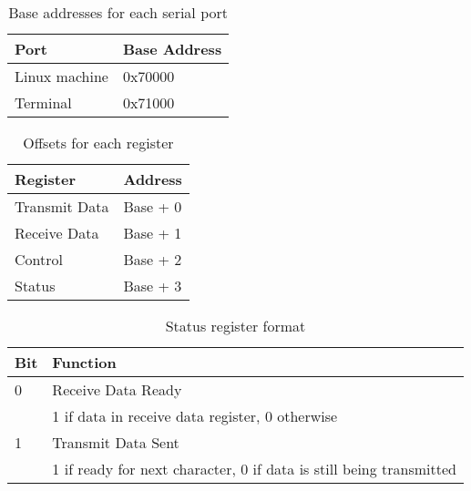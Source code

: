 \documentclass[a4paper,10pt]{article}
\begin{document}
\begin{table}[h]
\begin{center}
\begin{tabular}{|l|l|}
\hline
\textbf{Port} & \textbf{Base Address} \\
\hline
Linux machine & 0x70000 \\ 
\hline
Terminal & 0x71000 \\
\hline
\end{tabular}
\end{center}
\caption{Base addresses for each serial port}
\label{table:serialbase}
\end{table}

\begin{table}[h]
\begin{center}
\begin{tabular}{|l|l|}
\hline
\textbf{Register} & \textbf{Address} \\
\hline
Transmit Data & Base + 0 \\ 
\hline
Receive Data & Base + 1 \\
\hline
Control & Base + 2 \\
\hline
Status & Base + 3 \\
\hline
\end{tabular}
\end{center}
\caption{Offsets for each register}
\label{table:serialoffset}
\end{table}

\begin{table}[h]
\begin{center}
\begin{tabular}{|l|l|}
\hline
\textbf{Bit} & \textbf{Function} \\
\hline
0 & Receive Data Ready \\
 & 1 if data in receive data register, 0 otherwise \\
\hline
1 & Transmit Data Sent \\
 & 1 if ready for next character, 0 if data is still being transmitted  \\
\hline
\end{tabular}
\end{center}
\caption{Status register format}
\label{table:serialstat}
\end{table}
\end{document}
